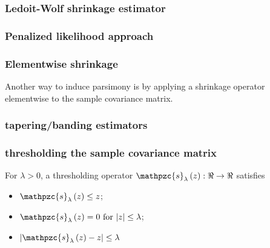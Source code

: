 \documentclass[12pt]{article}
\theoremstyle{definition}
\begin{document}
\subsubsection{Ledoit-Wolf shrinkage estimator}
\subsubsection{Penalized likelihood approach}
\subsubsection{Elementwise shrinkage} \label{subsubsection:chapter-1-sss-1-3-4}
Another way to induce parsimony is by applying a shrinkage operator elementwise to the sample covariance matrix. 

\subsubsection{tapering/banding estimators}
 

\subsubsection{thresholding the sample covariance matrix}

For $\lambda > 0$, a thresholding operator $\mathpzc{s}_\lambda\left( z \right): \Re \rightarrow \Re$ satisfies 
\begin{itemize}
\item $\mathpzc{s}_\lambda\left( z \right) \le z$;
\item $\mathpzc{s}_\lambda\left( z \right) = 0 \mbox{ for } \vert z\vert \le \lambda$;
\item $\vert \mathpzc{s}_\lambda\left( z \right) - z \vert \le \lambda$
\end{itemize}
\end{document}
